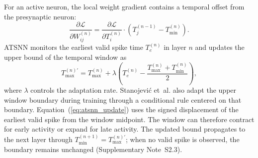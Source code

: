 \documentclass{nsr}
\begin{document}
For an active neuron, the local weight gradient contains a temporal offset from the presynaptic neuron:
\begin{equation}
\frac{\partial \mathcal{L}}{\partial W_{ij}^{(n)}} = \frac{\partial \mathcal{L}}{\partial T_i^{(n)}} \cdot \left(T_j^{(n-1)} - T_{\min}^{(n)}\right).
\label{eq:grad_w}
\end{equation}
ATSNN monitors the earliest valid spike time $T_{e}^{(n)}$ in layer $n$ and updates the upper bound of the temporal window as
\begin{equation}
T_{\max}^{(n)\prime} = T_{\max}^{(n)} + \lambda\!\left(T_{e}^{(n)} - \frac{T_{\max}^{(n)} + T_{\min}^{(n)}}{2}\right),
\label{eq:atsnn_update}
\end{equation}
where $\lambda$ controls the adaptation rate. Stanojevi\'{c} et~al. also adapt the upper window boundary during training through a conditional rule centered on that boundary. Equation~(\ref{eq:atsnn_update}) uses the signed displacement of the earliest valid spike from the window midpoint. The window can therefore contract for early activity or expand for late activity. The updated bound propagates to the next layer through $T_{\min}^{(n+1)}=T_{\max}^{(n)\prime}$; when no valid spike is observed, the boundary remains unchanged (Supplementary Note~S2.3).
\end{document}
